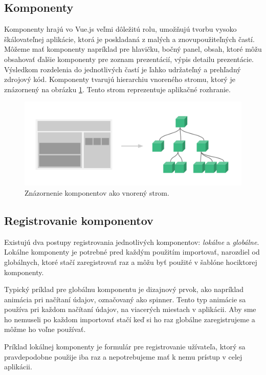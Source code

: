 \subsection*{Komponenty}
Komponenty hrajú vo Vue.js veľmi dôležitú rolu, umožňujú tvorbu vysoko škálovateľnej aplikácie, ktorá je poskladaná z malých a znovupoužiteľných častí. Môžeme mať komponenty napríklad pre hlavičku, bočný panel, obsah, ktoré môžu obsahovať ďalšie komponenty pre zoznam prezentácií, výpis detailu prezentácie. Výsledkom rozdelenia do jednotlivých častí je ľahko udržateľný a prehľadný zdrojový kód. Komponenty tvarujú hierarchiu vnoreného stromu, ktorý je znázornený na obrázku \ref{pic:components}. Tento strom reprezentuje aplikačné rozhranie.
    \begin{figure}[!hbt]
        \centering
        \includegraphics[scale=0.25]{obrazky/components.png}
        \caption{Znázornenie komponentov ako vnorený strom\cite{vue-guide}.}
        \label{pic:components}
    \end{figure}
    
\subsection*{Registrovanie komponentov}
Existujú dva postupy registrovania jednotlivých komponentov: \textit{lokálne} a \textit{globálne}. Lokálne komponenty je potrebné pred každým použitím importovať, narozdiel od globálnych, ktoré stačí zaregistrovať raz a môžu byť použité v šablóne hociktorej komponenty. 

Typický príklad pre globálnu komponentu je dizajnový prvok, ako napríklad animácia pri načítaní údajov, označovaný ako spinner. Tento typ animácie sa používa pri každom načítaní údajov, na viacerých miestach v aplikácii. Aby sme ho nemuseli po každom importovať stačí keď si ho raz globálne zaregistrujeme a môžme ho voľne používať. 

Príklad lokálnej komponenty je formulár pre registrovanie užívateľa, ktorý sa pravdepodobne použije iba raz a nepotrebujeme mať k nemu prístup v celej aplikácii.

